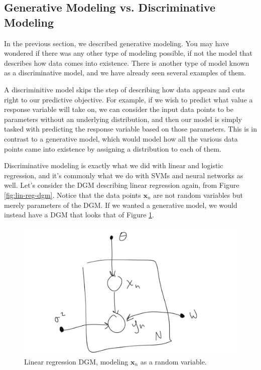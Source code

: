 \subsection{Generative Modeling vs. Discriminative Modeling}
In the previous section, we described generative modeling. You may have wondered if there was any other type of modeling possible, if not the model that describes how data comes into existence. There is another type of model known as a discriminative model, and we have already seen several examples of them.

A discriminitive model skips the step of describing how data appears and cuts right to our predictive objective. For example, if we wish to predict what value a response variable will take on, we can consider the input data points to be parameters without an underlying distribution, and then our model is simply tasked with predicting the response variable based on those parameters. This is in contrast to a generative model, which would model how all the various data points came into existence by assigning a distribution to each of them.

Discriminative modeling is exactly what we did with linear and logistic regression, and it's commonly what we do with SVMs and neural networks as well. Let's consider the DGM describing linear regression again, from Figure \ref{fig:lin-reg-dgm}. Notice that the data points $\textbf{x}_n$ are not random variables but merely parameters of the DGM. If we wanted a generative model, we would instead have a DGM that looks that of Figure \ref{fig:lin-reg-model-x}.
\begin{figure}
	\centering
	\includegraphics[width=0.5\paperwidth]{../GraphicalModels/fig/lin-reg-model-x.png}
    \caption{Linear regression DGM, modeling $\textbf{x}_n$ as a random variable.}
	\label{fig:lin-reg-model-x}
\end{figure}


